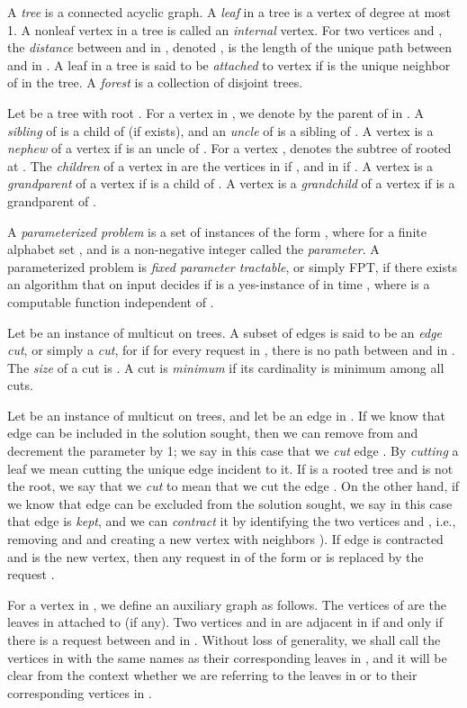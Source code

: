 \documentclass[11pt]{article}
\begin{document}
A {\em tree} is a connected acyclic graph. A {\em leaf} in a tree is a vertex of degree at most 1. A nonleaf vertex in a tree is called an {\em internal} vertex. For two vertices  and , the {\em distance} between  and  in , denoted , is the length of the unique path between  and  in . A leaf  in a tree is said to be {\em attached} to vertex  if  is the unique neighbor of  in the tree. A {\em forest} is a collection of disjoint trees.

Let  be a tree with root . For a vertex  in , we denote by  the parent of  in . A {\em sibling} of  is a child  of  (if exists), and an {\em uncle} of  is a sibling of . A vertex  is a {\em nephew} of a vertex  if  is an uncle of . For a vertex ,  denotes the subtree of  rooted at . The {\em children} of a vertex  in  are the vertices in  if , and in  if . A vertex  is a {\em grandparent} of a vertex  if  is a child of . A vertex  is a {\em grandchild} of a vertex  if  is a grandparent of .


A {\it parameterized problem} is a set of instances of the form , where  for a finite alphabet set , and
 is a non-negative integer called the {\em parameter}.
A parameterized problem  is {\it fixed parameter tractable}, or
simply FPT, if there exists an algorithm that on input 
decides if  is a yes-instance of  in time ,
where  is a computable function independent of .

Let  be an instance of {\sc multicut on trees}. A subset of edges  is said to be an {\em edge cut}, or simply a {\em cut}, for  if for every request  in , there is no path between  and  in . The {\em size} of a cut  is . A cut  is {\em minimum} if its cardinality is minimum among all cuts.

Let  be an instance of {\sc multicut on trees}, and let  be an edge in . If we know that edge  can be included in the solution sought, then we can remove  from  and decrement the parameter  by 1; we say in this case that we {\em cut} edge . By {\em cutting} a leaf we mean cutting the unique edge incident to it. If  is a rooted tree and  is not the root, we say that we {\em cut}  to mean that we cut the edge . On the other hand, if we know that edge  can be excluded from the solution sought, we say in this case that edge  is {\em kept}, and we can {\em contract} it by identifying the two vertices  and , i.e., removing  and  and creating a new vertex with neighbors ). If edge  is contracted and  is the new vertex, then any request in  of the form  or  is replaced by the request .

For a vertex  in , we define an auxiliary graph  as follows. The vertices of  are the leaves in  attached to  (if any). Two vertices  and  in  are adjacent in  if and only if there is a request between  and  in . Without loss of generality, we shall call the vertices in  with the same names as their corresponding leaves in , and it will be clear from the context whether we are referring to the leaves in  or to their corresponding vertices in .
\end{document}
